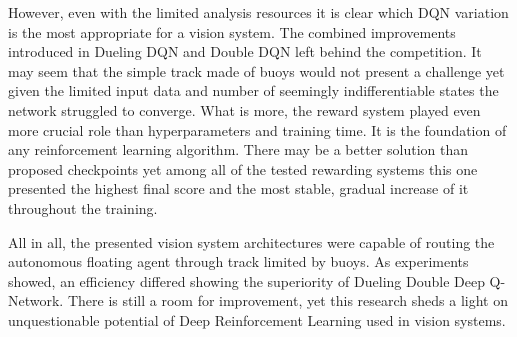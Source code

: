 However, even with the limited analysis resources it is clear which DQN variation is the most appropriate for a vision system. The
combined improvements introduced in Dueling DQN and Double DQN left behind the competition. It may seem that the simple track made of
buoys would not present a challenge yet given the limited input data and number of seemingly indifferentiable states the network
struggled to converge. What is more, the reward system played even more crucial role than hyperparameters and training time. It is
the foundation of any reinforcement learning algorithm. There may be a better solution than proposed checkpoints yet among all of the
tested rewarding systems this one presented the highest final score and the most stable, gradual increase of it throughout the training.

All in all, the presented vision system architectures were capable of routing the autonomous floating agent through track limited
by buoys. As experiments showed, an efficiency differed showing the superiority of Dueling Double Deep Q-Network. There is still a room
for improvement, yet this research sheds a light on unquestionable potential of Deep Reinforcement Learning used in vision systems.
